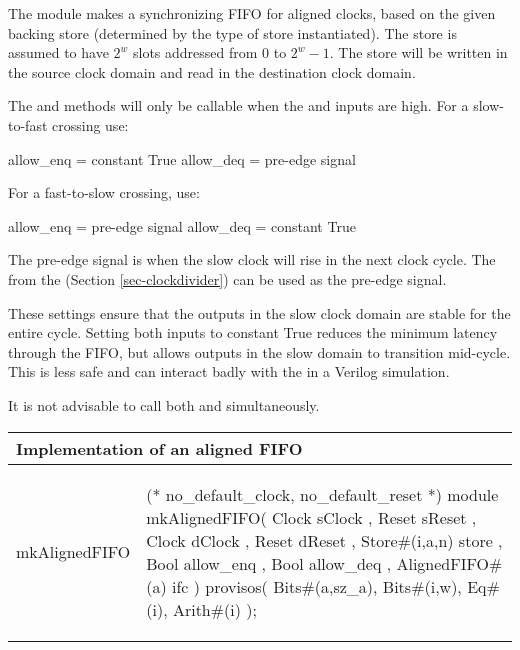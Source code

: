 The  module makes a synchronizing FIFO for aligned
clocks, based on the given backing store (determined by the type of
store instantiated).  The store is assumed to have $2^{w}$ slots
addressed from 0 to $2^{w}-1$.  The store will be written in the
source clock domain and read in the destination clock domain.

The  and  methods will only be callable when the
 and  inputs are high.  For a
slow-to-fast crossing use:
\begin{libverbatim}
allow_enq = constant True
allow_deq = pre-edge signal
\end{libverbatim}

For a fast-to-slow crossing, use:
\begin{libverbatim}
allow_enq = pre-edge signal
allow_deq = constant True
\end{libverbatim}

The pre-edge signal is  when the slow clock will rise in the
next clock cycle.   The
  from the  (Section
\ref{sec-clockdivider}) can be used as the pre-edge signal.

These settings ensure that the outputs in the slow clock domain are
stable for the entire cycle.  Setting both inputs to constant True
reduces the minimum latency through the FIFO, but allows outputs in
the slow domain to transition mid-cycle.  This is less safe and can
interact badly with the  in a Verilog simulation.


It is not advisable to call both  and  simultaneously.

\begin{center}
\begin{tabular}{|p{1.4 in}|p{4.1 in}|}
 \hline
\multicolumn{2}{|l|}{Implementation of an aligned FIFO}\\
\hline
\begin{libverbatim}mkAlignedFIFO
\end{libverbatim} 
& \begin{libverbatim}
(* no_default_clock, no_default_reset *)
module mkAlignedFIFO( Clock sClock
		    , Reset sReset
		    , Clock dClock
		    , Reset dReset
		    , Store#(i,a,n) store
		    , Bool allow_enq
		    , Bool allow_deq
		    , AlignedFIFO#(a) ifc
		    )
   provisos( Bits#(a,sz_a), Bits#(i,w), 
             Eq#(i), Arith#(i) );\end{libverbatim}
\\
\hline
\end{tabular}
\end{center}



